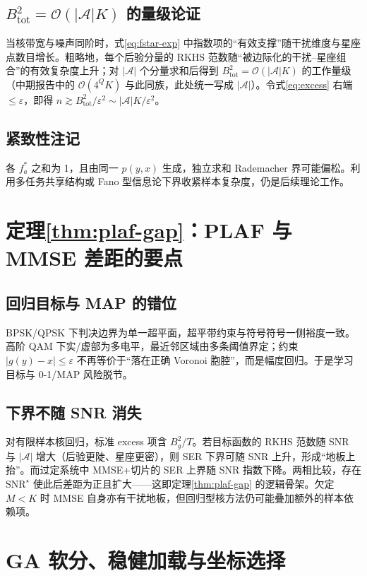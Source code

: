 \subsection{$B_{\mathrm{tot}}^2=\mathcal{O}(|\mathcal{A}|K)$ 的量级论证}
当核带宽与噪声同阶时，式\eqref{eq:fstar-exp} 中指数项的“有效支撑”随干扰维度与星座点数目增长。粗略地，每个后验分量的 RKHS 范数随“被边际化的干扰--星座组合”的有效复杂度上升；对 $|\mathcal{A}|$ 个分量求和后得到
$B_{\mathrm{tot}}^2=\mathcal{O}(|\mathcal{A}|K)$ 的工作量级（中期报告中的 $\mathcal{O}(4^Q K)$ 与此同族，此处统一写成 $|\mathcal{A}|$）。令式\eqref{eq:excess} 右端 $\le\varepsilon$，即得
$n\gtrsim B_{\mathrm{tot}}^2/\varepsilon^2\sim|\mathcal{A}|K/\varepsilon^2$。

\subsection{紧致性注记}
各 $f_a^*$ 之和为 1，且由同一 $p(y,x)$ 生成，独立求和 Rademacher 界可能偏松。利用多任务共享结构或 Fano 型信息论下界收紧样本复杂度，仍是后续理论工作。

\section{定理\ref{thm:plaf-gap}：PLAF 与 MMSE 差距的要点}

\subsection{回归目标与 MAP 的错位}
BPSK/QPSK 下判决边界为单一超平面，超平带约束与符号符号一侧裕度一致。高阶 QAM 下实/虚部为多电平，最近邻区域由多条阈值界定；约束 $|g(y)-x|\le\varepsilon$ 不再等价于“落在正确 Voronoi 胞腔”，而是幅度回归。于是学习目标与 0-1/MAP 风险脱节。

\subsection{下界不随 SNR 消失}
对有限样本核回归，标准 excess 项含 $B_g^2/T$。若目标函数的 RKHS 范数随 SNR 与 $|\mathcal{A}|$ 增大（后验更陡、星座更密），则 SER 下界可随 SNR 上升，形成“地板上抬”。而过定系统中 MMSE+切片的 SER 上界随 SNR 指数下降\cite{proakis2008}。两相比较，存在 $\mathrm{SNR}^\star$ 使此后差距为正且扩大——这即定理\ref{thm:plaf-gap} 的逻辑骨架。欠定 $M<K$ 时 MMSE 自身亦有干扰地板，但回归型核方法仍可能叠加额外的样本依赖项。

\section{GA 软分、稳健加载与坐标选择}

